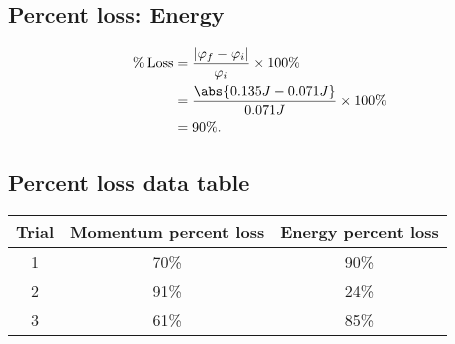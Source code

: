 \documentclass{report}
\begin{document}
    \bigbreak \noindent 
    \subsection{Percent loss: Energy}
        \begin{align*}
        \% \operatorname{Loss}&=\frac{\left|\varphi_f-\varphi_i\right|}{\varphi_i} \times 100 \% \\
                              &= \frac{\abs{0.135J - 0.071J}}{0.071J} \times 100\% \\
                              &=90\%
    .\end{align*}

    \bigbreak \noindent 
    \subsection{Percent loss data table}
    \begin{center}
        \begin{tabular}{c|c|c}
            Trial  &  Momentum percent loss & Energy percent loss \\
            \hline
            1 &70\% & 90\%\\ 
            2 & 91\% & 24\%\\ 
            3 & 61\% & 85\%\\
        \end{tabular}
    \end{center}



    \bigbreak \noindent 
\end{document}
